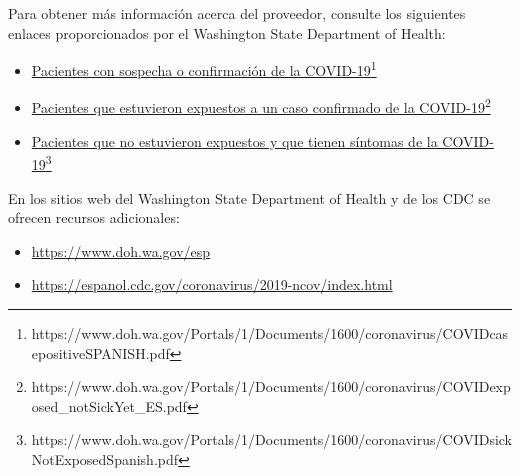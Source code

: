 \documentclass[10pt]{article}
\newcommand{\link}[2]{\href{#1}{#2}\footnote{#1}}
\begin{document}
Para obtener más información acerca del proveedor, consulte los siguientes
enlaces proporcionados por el Washington State Department of Health:

\begin{itemize}
\item

  \link{https://www.doh.wa.gov/Portals/1/Documents/1600/coronavirus/COVIDcasepositiveSPANISH.pdf}{Pacientes
  con sospecha o confirmación de la COVID-19}

\item

  \link{https://www.doh.wa.gov/Portals/1/Documents/1600/coronavirus/COVIDexposed\_notSickYet\_ES.pdf}{Pacientes
  que estuvieron expuestos a un caso confirmado de la COVID-19}

\item

  \link{https://www.doh.wa.gov/Portals/1/Documents/1600/coronavirus/COVIDsickNotExposedSpanish.pdf}{Pacientes
  que no estuvieron expuestos y que tienen síntomas de la COVID-19}

\end{itemize}

En los sitios web del Washington State Department of Health y de los CDC se
ofrecen recursos adicionales:

\begin{itemize}
\item

  \url{https://www.doh.wa.gov/esp}

\item

  \url{https://espanol.cdc.gov/coronavirus/2019-ncov/index.html}

\end{itemize}
\end{document}
